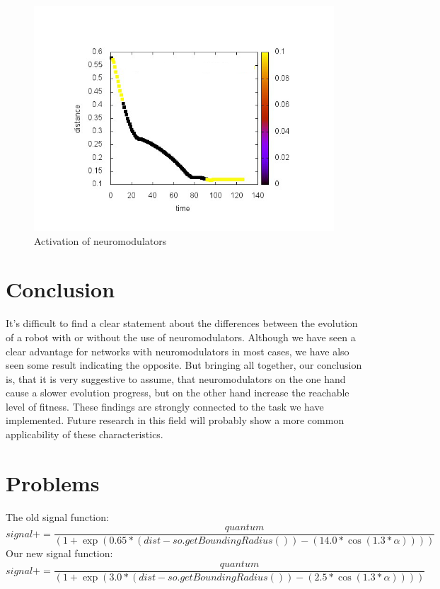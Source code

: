 \documentclass[12pt,fleqn,a4paper]{article}
\begin{document}
\begin{figure}[H]
\centering
\includegraphics[scale=0.5]{img/dose_plot.png}
\caption{Activation of neuromodulators}
\label{fig:diagram4}
\end{figure}


\newpage

\section{Conclusion}
It's difficult to find a clear statement about the differences between the evolution of a robot with or without the use of neuromodulators. Although we have seen a clear advantage for networks with neuromodulators in most cases, we have also seen some result indicating the opposite. But bringing all together, our conclusion is, that it is very suggestive to assume, that neuromodulators on the one hand cause a slower evolution progress, but on the other hand increase the reachable level of fitness. These findings are strongly connected to the task we have implemented. Future research in this field will probably show a more common applicability of these characteristics.

\section{Problems}
The old signal function:
\[signal += \frac{quantum}{(1 + \exp(0.65 * (dist - so.getBoundingRadius()) - (14.0 * \cos(1.3 * \alpha))))}\]
Our new signal function:
\[signal += \frac{quantum}{(1 + \exp(3.0 * (dist - so.getBoundingRadius()) - (2.5 * \cos(1.3 * \alpha))))}\]
\end{document}
